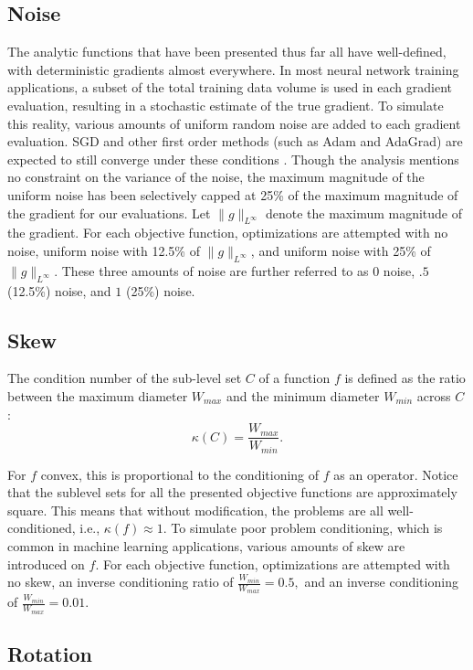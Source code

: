 \documentclass[letterpaper, 10 pt, conference]{IEEEtran}  %
\begin{document}
\subsection{Noise}

The analytic functions that have been presented thus far all have
well-defined, with deterministic gradients almost everywhere.  In most
neural network training applications, a subset of the total training
data volume is used in each gradient evaluation, resulting in a
stochastic estimate of the true gradient.  To simulate this reality,
various amounts of uniform random noise are added to each gradient
evaluation.  SGD and other first order methods (such as Adam and
AdaGrad) are expected to still converge under these conditions
\cite{nemirovski2009robust}.  Though the analysis mentions no
constraint on the variance of the noise, the maximum magnitude of the
uniform noise has been selectively capped at 25\% of the maximum
magnitude of the gradient for our evaluations.  Let $\|g\|_{L^\infty}$
denote the maximum magnitude of the gradient.  For each objective
function, optimizations are attempted with no noise, uniform noise
with 12.5\% of $\|g\|_{L^\infty}$, and uniform noise with 25\% of
$\|g\|_{L^\infty}$. These three amounts of noise are further referred
to as $0$ noise, $.5$ (12.5\%) noise, and $1$ (25\%) noise.

\subsection{Skew}

The condition number of the sub-level set $C$ of a function $f$ is
defined as the ratio between the maximum diameter $W_{max}$ and the
minimum diameter $W_{min}$ across $C$:
$$ \kappa(C) = \frac{W_{max}}{W_{min}}.$$

For $f$ convex, this is proportional to the conditioning of $f$ as an
operator.  Notice that the sublevel sets for all the presented
objective functions are approximately square.  This means that without
modification, the problems are all well-conditioned, i.e., $\kappa(f)
\approx 1$.  To simulate poor problem conditioning, which is common in
machine learning applications, various amounts of skew are introduced
on $f$.  For each objective function, optimizations are attempted with
no skew, an inverse conditioning ratio of $\frac{W_{min}}{W_{max}} =
0.5,$ and an inverse conditioning of $\frac{W_{min}}{W_{max}} = 0.01.$

\subsection{Rotation}
\end{document}
